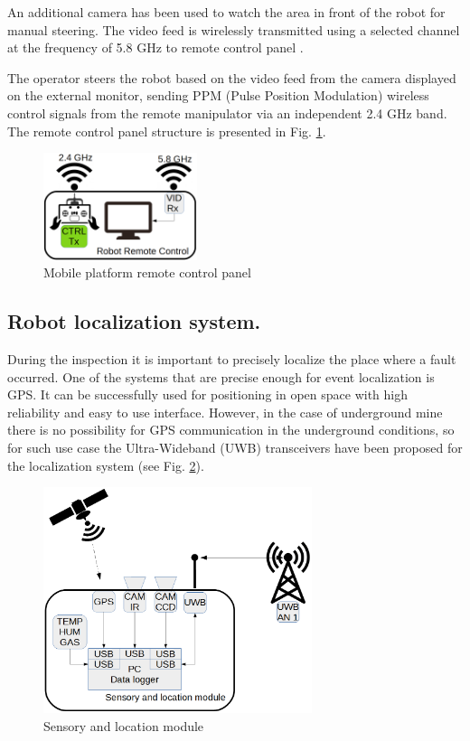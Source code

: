 \documentclass[3p,times,12pt]{elsarticle}
\begin{document}
An additional camera has been used to watch the area in front of the robot for manual steering. The video feed is wirelessly transmitted using a selected channel at the frequency of 5.8 GHz to remote control panel \cite{RobotLeg}. 

The operator steers the robot based on the video feed from the camera displayed on the external monitor, sending PPM (Pulse Position Modulation) wireless control signals from the remote manipulator via an independent 2.4 GHz band. The remote control panel structure is presented in Fig. \ref{fig:Robot_Control_panel}. 

\begin{figure}[ht!]
	\centering
	\includegraphics[width=0.4\textwidth]{Remote_Control.png}
	\caption{Mobile platform remote control panel}
	\label{fig:Robot_Control_panel}
\end{figure}

\subsection{Robot localization system.}
During the inspection it is important to precisely localize the place where a fault occurred. One of the systems that are precise enough for event localization is GPS. It can be successfully used for positioning in open space with high reliability and easy to use interface. However, in the case of underground mine there is no possibility for GPS communication in the underground conditions, so for such use case the Ultra-Wideband (UWB) transceivers have been proposed for the localization system (see Fig. \ref{fig:sensors}). 

\begin{figure}[ht!]
\includegraphics[width=0.7\textwidth]{Sensory_system.png}
\centering
\caption{Sensory and location module} \label{fig:sensors}
\end{figure}
\end{document}
